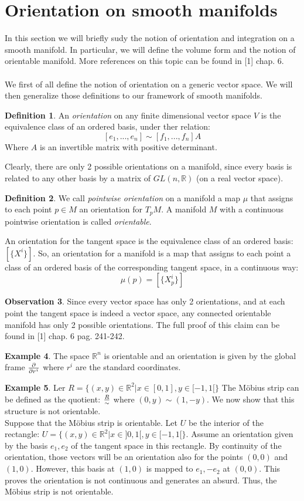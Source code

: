 \documentclass[12pt,a4paper]{report}
\theoremstyle{definition}
\newtheorem{Def}{Definition}[chapter]
\theoremstyle{Theorem}
\theoremstyle{definition}
\newtheorem{Ex}[Def]{Example}
\theoremstyle{definition}
\newtheorem{Obs}[Def]{Observation}
\begin{document}
	\section{Orientation on smooth manifolds}
	In this section we will briefly sudy the notion of orientation and integration on a smooth manifold. In particular, we will define the volume form and the notion of orientable manifold. More references on this topic can be found in [1] chap. 6.
	\\
	\\
	We first of all define the notion of orientation on a generic vector space. We will then generalize those definitions to our framework of smooth manifolds.
	\begin{Def}
		An \textit{orientation} on any finite dimensional vector space $V$ is the equivalence class of an ordered basis, under ther relation:
		$$[e_1,...,e_n]\sim[f_1,...,f_n]A$$
		Where $A$ is an invertible matrix with positive determinant.
	\end{Def}
	Clearly, there are only 2 possible orientations on a manifold, since every basis is related to any other basis by a matrix of $GL(n,\mathbb{R})$ (on a real vector space).
	\begin{Def}
		We call \textit{pointwise orientation} on a manifold a map $\mu$ that assigns to each point $p\in M$ an orientation for $T_pM$. A manifold $M$ with a continuous pointwise orientation  is called \textit{orientable}.
	\end{Def}
	An orientation for the tangent space is the equivalence class of an ordered basis: $[\{X^i\}]$. So, an orientation for a manifold is a map that assigns to each point a class of an ordered basis of the corresponding tangent space, in a continuous way:
	$$\mu(p)=[\{X^i_p\}]$$
	\begin{Obs}
		Since every vector space has only 2 orientations, and at each point the tangent space is indeed a vector space, any connected orientable manifold has only 2 possible orientations. The full proof of this claim can be found in [1] chap. 6 pag. 241-242.
	\end{Obs}
	\begin{Ex}
		The space $\mathbb{R}^n$ is orientable and an orientation is given by the global frame ${\partial\over \partial{r^i}}$ where $r^i$ are the standard coordinates.
	\end{Ex}
	\begin{Ex}
		Ler $R=\{(x,y)\in \mathbb{R}^2|x\in[0,1], y\in [-1,1[\}$
		The Möbius strip can be defined as the quotient: $R\over \sim$ where $(0,y)\sim(1,-y)$. We now show that this structure is not orientable.\\
		Suppose that the Möbius strip is orientable. Let $U$ be the interior of the rectangle: $U=\{(x,y)\in \mathbb{R}^2|x\in]0,1[, y\in [-1,1[\}$. Assume an orientation given by the basis $e_1,e_2$ of the tangent space in this rectangle. By continuity of the orientation, those vectors will be an orientation also for the points $(0,0)$ and $(1,0)$. However, this basis at $(1,0)$ is mapped to $e_1,-e_2$ at $(0,0)$. This proves the orientation is not continuous and generates an absurd. Thus, the Möbius strip is not orientable.
	\end{Ex}
\end{document}
